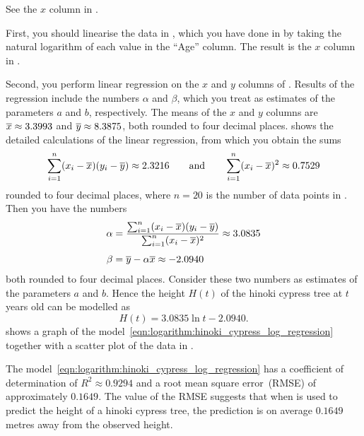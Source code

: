 \documentclass[a4paper,oneside,12pt]{article}
\begin{document}
\begin{solution}
See the $x$ column in
.

First, you should linearise the data in
, which you have done
in  by taking
the natural logarithm of each value in the ``Age'' column.  The result
is the $x$ column in
.

Second, you perform linear regression on the $x$ and $y$ columns of
.  Results
of the regression include the numbers $\alpha$ and $\beta$, which you
treat as estimates of the parameters $a$ and $b$, respectively.  The
means of the $x$ and $y$ columns are $\overline{x} \approx 3.3993$ and
$\overline{y} \approx 8.3875$, both rounded to four decimal places.
 shows the
detailed calculations of the linear regression, from which you obtain
the sums
\[
\sum_{i=1}^n (x_i - \overline{x}) (y_i - \overline{y})
\approx
2.3216
\qquad
\text{and}
\qquad
\sum_{i=1}^n (x_i - \overline{x})^2
\approx
0.7529
\]
rounded to four decimal places, where $n = 20$ is the number of data
points in .  Then you have the
numbers
\begin{align*}
\alpha
&=
\frac{
  \sum_{i=1}^n (x_i - \overline{x}) (y_i - \overline{y})
}{
  \sum_{i=1}^n (x_i - \overline{x})^2
}
\approx
3.0835 \\[4pt]
\beta
&=
\overline{y} - \alpha\overline{x}
\approx
-2.0940
\end{align*}
both rounded to four decimal places.  Consider these two numbers as
estimates of the parameters $a$ and $b$.  Hence the height $H(t)$ of
the hinoki cypress tree at $t$ years old can be modelled as
\begin{equation}
\label{eqn:logarithm:hinoki_cypress_log_regression}
H(t)
=
3.0835 \ln t - 2.0940.
\end{equation}
 shows a graph of the
model~\eqref{eqn:logarithm:hinoki_cypress_log_regression} together
with a scatter plot of the data in
.

The model~\eqref{eqn:logarithm:hinoki_cypress_log_regression} has a
coefficient of determination of $R^2 \approx 0.9294$ and a root mean
square error~(RMSE) of approximately $0.1649$.  The value of the RMSE
suggests that when
 is used to
predict the height of a hinoki cypress tree, the prediction is on
average $0.1649$ metres away from the observed height.
\end{solution}
\end{document}
